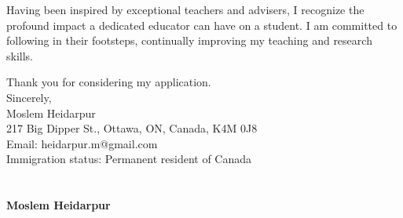 \documentclass[12pt,oneside]{book}
\begin{document}
Having been inspired by exceptional teachers and advisers, I recognize the profound impact a dedicated educator can have on a student. I am committed to following in their footsteps, continually improving my teaching and research skills.

Thank you for considering my application.
\vspace*{1\baselineskip}
\phantom \quad \\
Sincerely,\\[0.2cm]
Moslem Heidarpur\\
217 Big Dipper St., Ottawa, ON, Canada, K4M 0J8\\
Email: heidarpur.m@gmail.com\\
Immigration status: Permanent resident of Canada\\[-0.1cm]
\newpage
\lhead{\textcolor{gray}{Curriculum vitae}}
\large \bf \hphantom \\ \\ 
 {\selectfont Moslem Heidarpur} \mdseries \normalsize \\ \\ 
\end{document}

